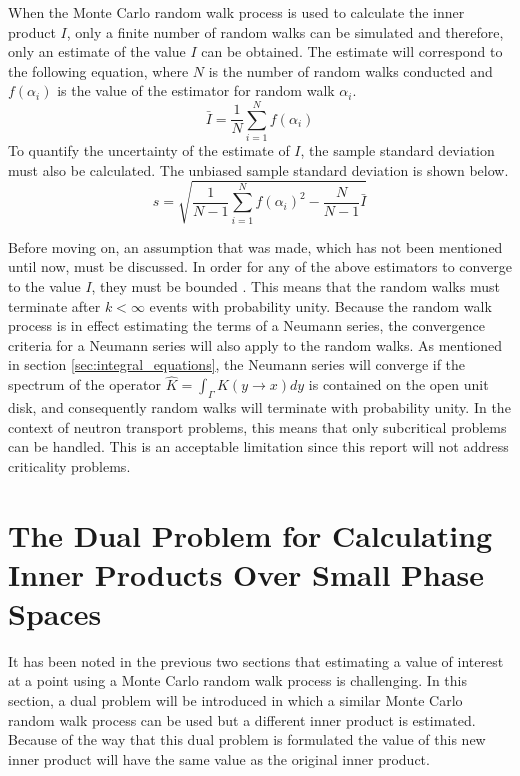 When the Monte Carlo random walk process is used to calculate the inner product
$I$, only a finite number of random walks can be simulated and therefore, only 
an estimate of the value $I$ can be obtained. The estimate will
correspond to the following equation, where $N$ is the number of random walks
conducted and $f(\alpha_i)$ is the value of the estimator for random
walk $\alpha_i$.
\begin{equation}
  \bar{I} = \frac{1}{N} \sum_{i=1}^N f(\alpha_i)
  \label{eq:inner_product_estimate}
\end{equation}
To quantify the uncertainty of the estimate of $I$, the sample standard 
deviation must also be calculated. The unbiased sample standard deviation is 
shown below.
\begin{equation}
  s = \sqrt{\frac{1}{N-1}\sum_{i=1}^N f(\alpha_i)^2 - \frac{N}{N-1}\bar{I}}
  \label{eq:inner_product_stddev}
\end{equation}

Before moving on, an assumption that was made, which has not been mentioned
until now, must be discussed. In order for any of the above estimators to 
converge to the value $I$, they must be bounded \citep{spanier_monte_1969}. This
means that the random walks must terminate after $k < \infty$ events with 
probability unity. Because the random walk process is in effect estimating the
terms of a Neumann series, the convergence criteria for a Neumann series will
also apply to the random walks. As mentioned in section 
\ref{sec:integral_equations}, the Neumann series will converge if the spectrum
of the operator $\hat{K} = \int_{\Gamma} K(y \to x)dy$ is contained on the open
unit disk, and consequently random walks will terminate with probability unity.
In the context of neutron transport problems, this means that only subcritical 
problems can be handled. This is an acceptable limitation since this report 
will not address criticality problems.

\section{The Dual Problem for Calculating Inner Products Over Small Phase 
  Spaces}
\label{sec:dual_problems}
It has been noted in the previous two sections that estimating a value of 
interest at a point using a Monte Carlo random walk process is challenging.
In this section, a dual problem will be introduced in which a similar Monte 
Carlo random walk process can be used but a different inner product is 
estimated. Because of the way that this dual problem is formulated the value of 
this new inner product will have the same value as the original inner product. 


